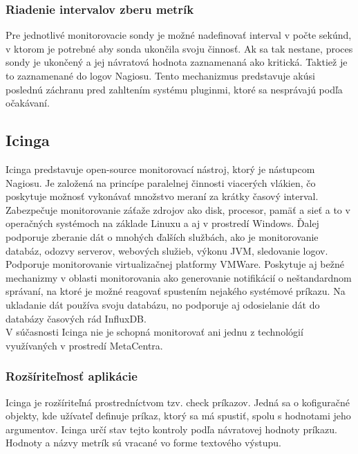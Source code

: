 \documentclass[printed,11pt,twoside,color,cover,table]{fithesis3}
\begin{document}
\subsubsection{Riadenie intervalov zberu metrík}
Pre jednotlivé monitorovacie sondy je možné nadefinovať interval v počte sekúnd, v ktorom je potrebné aby sonda ukončila svoju činnosť. Ak sa tak nestane, proces sondy je ukončený a jej návratová hodnota
zaznamenaná ako kritická. Taktiež je to zaznamenané do logov Nagiosu. Tento mechanizmus predstavuje akúsi poslednú záchranu pred zahltením systému pluginmi, ktoré sa nesprávajú podľa očakávaní.

\subsection{Icinga}
Icinga predstavuje open-source monitorovací nástroj, ktorý je nástupcom Nagiosu. Je založená na princípe paralelnej činnosti viacerých vlákien, čo poskytuje možnosť vykonávať množstvo meraní
za krátky časový interval. Zabezpečuje monitorovanie záťaže zdrojov ako disk, procesor, pamäť a sieť a to v operačných systémoch na základe Linuxu a aj v prostredí Windows. Ďalej podporuje zberanie
dát o mnohých ďalších službách, ako je monitorovanie databáz, odozvy serverov, webových služieb, výkonu JVM\footnotemark{}, sledovanie logov. Podporuje monitorovanie virtualizačnej platformy VMWare. 
Poskytuje aj bežné mechanizmy v oblasti monitorovania ako generovanie notifikácií o neštandardnom správaní, na ktoré je možné reagovať spustením nejakého systémové príkazu. Na ukladanie dát 
používa svoju databázu, no podporuje aj odosielanie dát do databázy časových rád InfluxDB.
\\V súčasnosti Icinga nie je schopná monitorovať ani jednu z technológií využívaných v prostredí MetaCentra.

\subsubsection{Rozšíriteľnosť aplikácie}
Icinga je rozšíriteľná prostredníctvom tzv. check príkazov. Jedná sa o kofiguračné objekty, kde užívateľ definuje príkaz, ktorý sa má spustiť, spolu s hodnotami jeho argumentov. 
Icinga určí stav tejto kontroly podľa návratovej hodnoty príkazu.\cite{icinga-plugin} Hodnoty a názvy metrík sú vracané vo forme textového výstupu.
\end{document}
